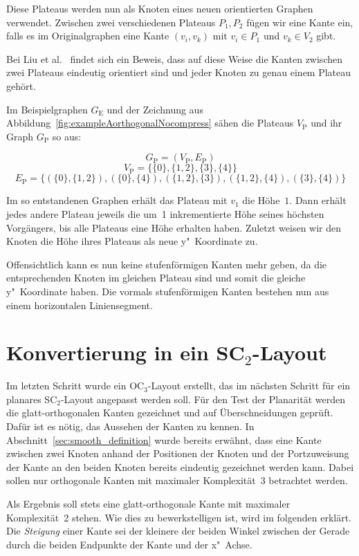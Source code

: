 \documentclass[a4paper]{scrreprt}
\theoremstyle{definition}
\begin{document}
Diese Plateaus werden nun als Knoten eines neuen orientierten Graphen verwendet. Zwischen zwei verschiedenen Plateaus $P_1, P_2$ fügen wir eine Kante ein, falls es im Originalgraphen eine Kante $(v_i, v_k)$ mit $v_i \in P_1$ und $v_k \in V_2$ gibt.

Bei Liu et al.~\cite{liu+etal-98} findet sich ein Beweis, dass auf diese Weise die Kanten zwischen zwei Plateaus eindeutig orientiert sind und jeder Knoten zu genau einem Plateau gehört. 

Im Beispielgraphen $G_\text{E}$ und der Zeichnung aus Abbildung~\ref{fig:exampleAorthogonalNocompress} sähen die Plateaus $V_\text{P}$ und ihr Graph $G_\text{P}$ so aus:

\[G_\text{P} = (V_\text{P}, E_\text{P})\]
\[V_\text{P} = \{\{0\}, \{1, 2\}, \{3\}, \{4\}\}\]
\[E_\text{P} = \{(\{0\}, \{1, 2\}), (\{0\}, \{4\}), (\{1, 2\}, \{3\}), (\{1, 2\}, \{4\}), (\{3\}, \{4\})\}\]


Im so entstandenen Graphen erhält das Plateau mit $v_1$ die Höhe~$1$. Dann erhält jedes andere Plateau jeweils die um~1 inkrementierte Höhe seines höchsten Vorgängers, bis alle Plateaus eine Höhe erhalten haben. Zuletzt weisen wir den Knoten die Höhe ihres Plateaus als neue y"~Koordinate zu.

Offensichtlich kann es nun keine stufenförmigen Kanten mehr geben, da die entsprechenden Knoten im gleichen Plateau sind und somit die gleiche y"~Koordinate haben. Die vormals stufenförmigen Kanten bestehen nun aus einem horizontalen Liniensegment.

\section{Konvertierung in ein SC$_2$-Layout}
\label{sec:sc2conversion}

Im letzten Schritt wurde ein OC$_3$-Layout erstellt, das im nächsten Schritt für ein planares SC$_2$-Layout angepasst werden soll. Für den Test der Planarität werden die glatt-orthogonalen Kanten gezeichnet und auf Überschneidungen geprüft. Dafür ist es nötig, das Aussehen der Kanten zu kennen. In Abschnitt~\ref{sec:smooth_definition} wurde bereits erwähnt, dass eine Kante zwischen zwei Knoten anhand der Positionen der Knoten und der Portzuweisung der Kante an den beiden Knoten bereits eindeutig gezeichnet werden kann. Dabei sollen nur orthogonale Kanten mit maximaler Komplexität~3 betrachtet werden.

Als Ergebnis soll stets eine glatt-orthogonale Kante mit maximaler Komplexität~2 stehen. Wie dies zu bewerkstelligen ist, wird im folgenden erklärt. Die \emph{Steigung} einer Kante sei der kleinere der beiden Winkel zwischen der Gerade durch die beiden Endpunkte der Kante und der x"~Achse.
\end{document}
